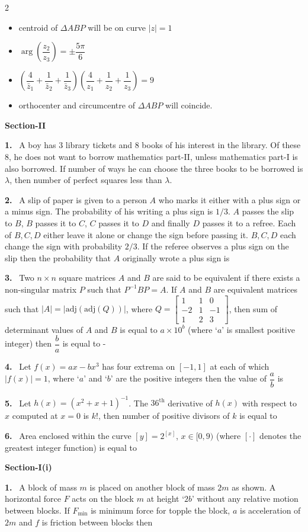 \documentclass[10pt]{extarticle}
\newcommand{\papersec}[1]{\par\bigskip{\centering\Large\bfseries PAPER-#1\par}\medskip}
\newcommand{\partsec}[2]{\par\medskip\noindent{\large\bfseries PART-#1: #2}\par\smallskip}
\newcommand{\sect}[1]{\par\smallskip\noindent\textbf{#1}\par}
\newcommand{\qn}[1]{\par\smallskip\noindent\textbf{#1.}~}
\newenvironment{qoptions}{\begin{itemize}[leftmargin=1.8em,itemsep=1pt,topsep=2pt,label={}]}{\end{itemize}}
\newcommand{\opt}[2]{\item[(#1)] #2}
\begin{document}
\begin{multicols}{2}
\begin{qoptions}
\opt{A}{centroid of $\Delta ABP$ will be on curve $|z|=1$}
\opt{B}{$\arg\left(\dfrac{z_2}{z_3}\right)=\pm\dfrac{5\pi}6$}
\opt{C}{$\left(\dfrac4{\bar z_1}+\dfrac1{\bar z_2}+\dfrac1{\bar z_3}\right)\left(\dfrac4{z_1}+\dfrac1{z_2}+\dfrac1{z_3}\right)=9$}
\opt{D}{orthocenter and circumcentre of $\Delta ABP$ will coincide.}
\end{qoptions}
\sect{Section-II}
\qn{1} A boy has $3$ library tickets and $8$ books of his interest in the library. Of these $8$, he does not want to borrow mathematics part-II, unless mathematics part-I is also borrowed. If number of ways he can choose the three books to be borrowed is $\lambda$, then number of perfect squares less than $\lambda$.
\qn{2} A slip of paper is given to a person $A$ who marks it either with a plus sign or a minus sign. The probability of his writing a plus sign is $1/3$. $A$ passes the slip to $B$, $B$ passes it to $C$, $C$ passes it to $D$ and finally $D$ passes it to a refree. Each of $B,C,D$ either leave it alone or change the sign before passing it. $B,C,D$ each change the sign with probability $2/3$. If the referee observes a plus sign on the slip then the probability that $A$ originally wrote a plus sign is
\qn{3} Two $n\times n$ square matrices $A$ and $B$ are said to be equivalent if there exists a non-singular matrix $P$ such that $P^{-1}BP=A$. If $A$ and $B$ are equivalent matrices such that $|A|=|\mathrm{adj}(\mathrm{adj}(Q))|$, where $Q=\begin{bmatrix}1&1&0\\-2&1&-1\\1&2&3\end{bmatrix}$, then sum of determinant values of $A$ and $B$ is equal to $a\times10^b$ (where `$a$' is smallest positive integer) then $\dfrac ba$ is equal to -
\qn{4} Let $f(x)=ax-bx^3$ has four extrema on $[-1,1]$ at each of which $|f(x)|=1$, where `$a$' and `$b$' are the positive integers then the value of $\dfrac ab$ is
\qn{5} Let $h(x)=(x^2+x+1)^{-1}$. The $36^\mathrm{th}$ derivative of $h(x)$ with respect to $x$ computed at $x=0$ is $k!$, then number of positive divisors of $k$ is equal to
\qn{6} Area enclosed within the curve $[y]=2^{[x]}$, $x\in[0,9)$ (where $[\cdot]$ denotes the greatest integer function) is equal to
\papersec{2}
\partsec{1}{PHYSICS}
\sect{Section-I(i)}
\qn{1} A block of mass $m$ is placed on another block of mass $2m$ as shown. A horizontal force $F$ acts on the block $m$ at height `$2b$' without any relative motion between blocks. If $F_{\min}$ is minimum force for topple the block, $a$ is acceleration of $2m$ and $f$ is friction between blocks then

\end{multicols}
\end{document}
